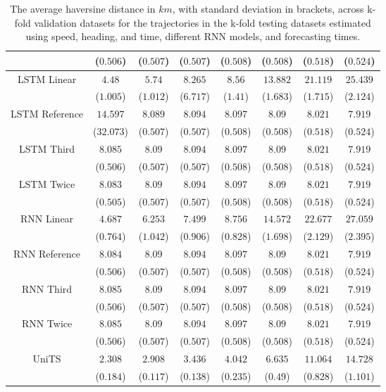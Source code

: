 \begin{table}[!ht]
{\begin{tabular}{|c|c|c|c|c|c|c|c|}
			 & ($0.506$) & ($0.507$) & ($0.507$) & ($0.508$) & ($0.508$) & ($0.518$) & ($0.524$) \\ \hline
			\multirow{2}{*}{LSTM Linear} & $4.48$ & $5.74$ & $8.265$ & $8.56$ & $13.882$ & $21.119$ & $25.439$ \\
			 & ($1.005$) & ($1.012$) & ($6.717$) & ($1.41$) & ($1.683$) & ($1.715$) & ($2.124$) \\ \hline
			\multirow{2}{*}{LSTM Reference} & $14.597$ & $8.089$ & $8.094$ & $8.097$ & $8.09$ & $8.021$ & $7.919$ \\
			 & ($32.073$) & ($0.507$) & ($0.507$) & ($0.508$) & ($0.508$) & ($0.518$) & ($0.524$) \\ \hline
			\multirow{2}{*}{LSTM Third} & $8.085$ & $8.09$ & $8.094$ & $8.097$ & $8.09$ & $8.021$ & $7.919$ \\
			 & ($0.506$) & ($0.507$) & ($0.507$) & ($0.508$) & ($0.508$) & ($0.518$) & ($0.524$) \\ \hline
			\multirow{2}{*}{LSTM Twice} & $8.083$ & $8.09$ & $8.094$ & $8.097$ & $8.09$ & $8.021$ & $7.919$ \\
			 & ($0.505$) & ($0.507$) & ($0.507$) & ($0.508$) & ($0.508$) & ($0.518$) & ($0.524$) \\ \hline
			\multirow{2}{*}{RNN Linear} & $4.687$ & $6.253$ & $7.499$ & $8.756$ & $14.572$ & $22.677$ & $27.059$ \\
			 & ($0.764$) & ($1.042$) & ($0.906$) & ($0.828$) & ($1.698$) & ($2.129$) & ($2.395$) \\ \hline
			\multirow{2}{*}{RNN Reference} & $8.084$ & $8.09$ & $8.094$ & $8.097$ & $8.09$ & $8.021$ & $7.919$ \\
			 & ($0.506$) & ($0.507$) & ($0.507$) & ($0.508$) & ($0.508$) & ($0.518$) & ($0.524$) \\ \hline
			\multirow{2}{*}{RNN Third} & $8.085$ & $8.09$ & $8.094$ & $8.097$ & $8.09$ & $8.021$ & $7.919$ \\
			 & ($0.506$) & ($0.507$) & ($0.507$) & ($0.508$) & ($0.508$) & ($0.518$) & ($0.524$) \\ \hline
			\multirow{2}{*}{RNN Twice} & $8.085$ & $8.09$ & $8.094$ & $8.097$ & $8.09$ & $8.021$ & $7.919$ \\
			 & ($0.506$) & ($0.507$) & ($0.507$) & ($0.508$) & ($0.508$) & ($0.518$) & ($0.524$) \\ \hline
			\multirow{2}{*}{UniTS} & $2.308$ & $2.908$ & $3.436$ & $4.042$ & $6.635$ & $11.064$ & $14.728$ \\
			 & ($0.184$) & ($0.117$) & ($0.138$) & ($0.235$) & ($0.49$) & ($0.828$) & ($1.101$) \\ \hline
		\end{tabular}
	}
	\caption{The average haversine distance in $km$, with standard deviation in brackets, across k-fold validation datasets for the trajectories in the k-fold testing datasets estimated using speed, heading, and time, different RNN models, and forecasting times.}
	\label{tab:all_speed_actual_dir_haversine}
\end{table}